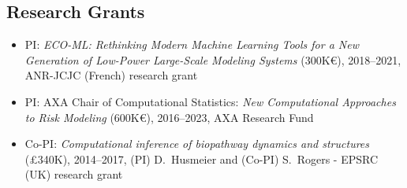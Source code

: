 \documentclass[a4paper,10pt]{article}
\newcommand{\ml}{\name{ml}}
\newcommand{\name}[1]{{\textsc{#1}}\xspace}
\begin{document}
\subsection*{Research Grants}
\begin{itemize}
  \item PI: \emph{ECO-ML: Rethinking Modern Machine Learning Tools for a New Generation of Low-Power Large-Scale Modeling Systems} (300K\euro), 2018--2021, ANR-JCJC (French) research grant
  \item PI: AXA Chair of Computational Statistics: \emph{New Computational Approaches to Risk Modeling} (600K\euro), 2016--2023, AXA Research Fund 
  \item Co-PI: \emph{Computational inference of biopathway dynamics and structures} (\pounds 340K), 2014--2017, (PI) D.~Husmeier and (Co-PI) S.~Rogers - EPSRC (UK) research grant 
\end{itemize}




\end{document}

